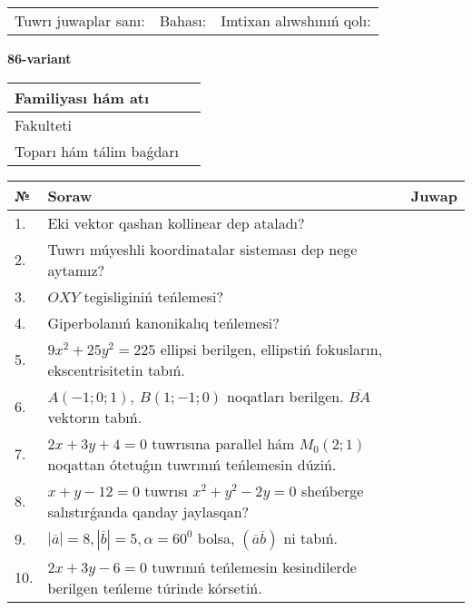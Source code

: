 \documentclass{article}
\begin{document}
\vspace{1cm}

\begin{tabular}{lll}
Tuwrı juwaplar sanı: \underline{\hspace{1.5cm}} & 
Bahası: \underline{\hspace{1.5cm}} & 
Imtixan alıwshınıń qolı: \underline{\hspace{2cm}} \\
\end{tabular}

\egroup

\newpage


\textbf{86-variant}\\

\bgroup
\def\arraystretch{1.6} %

\begin{tabular}{|m{5.7cm}|m{9.5cm}|}
\hline
Familiyası hám atı & \\
\hline
Fakulteti  & \\
\hline
Toparı hám tálim baǵdarı  & \\
\hline
\end{tabular}

\vspace{1cm}

\begin{tabular}{|m{0.7cm}|m{10cm}|m{4cm}|}
\hline
№ & Soraw & Juwap \\
\hline
1. & Eki vektor qashan kollinear dep ataladı? &  \\
\hline
2. & Tuwrı múyeshli koordinatalar sisteması dep nege aytamız? &  \\
\hline
3. & $OXY$ tegisliginiń teńlemesi? &  \\
\hline
4. & Giperbolanıń kanonikalıq teńlemesi? &  \\
\hline
5. & $9x^{2}+25y^{2}=225$ ellipsi berilgen, ellipstiń fokusların, ekscentrisitetin tabıń. &  \\
\hline
6. & $A (-1;0;1),\ B (1;-1;0)$ noqatları berilgen. $\overline{BA}$ vektorın tabıń. &  \\
\hline
7. & $2x+3y+4=0$ tuwrısına parallel hám $M_{0} (2;1)$ noqattan ótetuǵın tuwrınıń teńlemesin dúziń. &  \\
\hline
8. & $x+y-12=0$ tuwrısı $x^{2}+y^{2}-2y=0$ sheńberge salıstırǵanda qanday jaylasqan? &  \\
\hline
9. & $\left| \overline{a} \right|=8, \left| \overline{b} \right|=5, \alpha=60^{0}$ bolsa, $( \overline{a}\overline{b} )$ ni tabıń. &  \\
\hline
10. & $2x+3y-6=0$ tuwrınıń teńlemesin kesindilerde berilgen teńleme túrinde kórsetiń. &  \\
\hline
\end{tabular}
\end{document}
